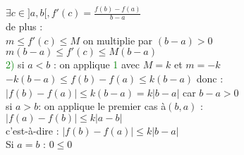 \documentclass{article}
\begin{document}
$\exists c \in ]a,b[, f'(c)= \frac{f(b)-f(a)}{b-a}$ \\ 
de plus : \\ 
$m \leq f'(c) \leq M$ on multiplie par $(b-a)>0$ \\ 
$m(b-a) \leq f'(c) \leq M(b-a)$ \\ 
\textcolor{green}{2)} si $a<b$ : on applique \textcolor{green}{1} avec $M=k$ et $m=-k$ \\ 
$-k (b-a) \leq f(b)-f(a) \leq k(b-a)$ donc : \\ 
$|f(b)-f(a)| \leq k(b-a)=k|b-a|$ car $b-a>0$ \\ 
si $a>b$: on applique le premier cas à$(b,a)$ : \\ 
$|f(a)-f(b)| \leq k |a-b|$ \\ 
c'est-à-dire : $|f(b)-f(a)| \leq k |b-a|$ \\ 
Si $a=b$ : $0 \leq 0$
\end{document}
